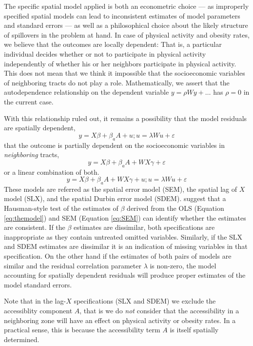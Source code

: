 \documentclass[Afour,sageh.bst]{sagej}
\begin{document}
The specific spatial model applied is both an econometric choice --- as
improperly specified spatial models can lead to inconsistent estimates
of model parameters and standard errors --- as well as a philosophical
choice about the likely structure of spillovers in the problem at hand.
In case of physical activity and obesity rates, we believe that the
outcomes are locally dependent: That is, a particular individual decides
whether or not to participate in physical activity independently of
whether his or her neighbors participate in physical activity. This does
not mean that we think it impossible that the socioeconomic variables of
neighboring tracts do not play a role. Mathematically, we assert that
the autodependence relationship on the dependent variable
\(y = \rho W y + \ldots\) has \(\rho = 0\) in the current case.

With this relationship ruled out, it remains a possibility that the
model residuals are spatially dependent, \begin{equation}\label{eq:SEM}
 y = X\beta + \beta_a A + u; u = \lambda W u + \varepsilon
\end{equation} that the outcome is partially dependent on the
socioeconomic variables in \emph{neighboring} tracts,
\begin{equation}\label{eq:SLX}
 y = X\beta + \beta_a A + W X \gamma + \varepsilon
\end{equation} or a linear combination of both.
\begin{equation}\label{eq:SDEM}
 y = X\beta + \beta_a A + W X \gamma + u; u = \lambda W u + \varepsilon 
\end{equation} These models are referred as the spatial error model
(SEM), the spatial lag of \(X\) model (SLX), and the spatial Durbin
error model (SDEM). \citet{Pace2008} suggest that a Hausman-style test
of the estimates of \(\beta\) derived from the OLS (Equation
\ref{eq:themodel}) and SEM (Equation \ref{eq:SEM}) can identify whether
the estimates are consistent. If the \(\beta\) estimates are dissimilar,
both specifications are inappropriate as they contain untreated omitted
variables. Similarly, if the SLX and SDEM estimates are dissimilar it is
an indication of missing variables in that specification. On the other
hand if the estimates of both pairs of models are similar and the
residual correlation parameter \(\lambda\) is non-zero, the model
accounting for spatially dependent residuals will produce proper
estimates of the model standard errors.

Note that in the lag-\(X\) specifications (SLX and SDEM) we exclude the
accessiblity component \(A\), that is we do \emph{not} consider that the
accessibility in a neighboring zone will have an effect on physical
activity or obesity rates. In a practical sense, this is because the
accessibility term \(A\) is itself spatially determined.
\end{document}

